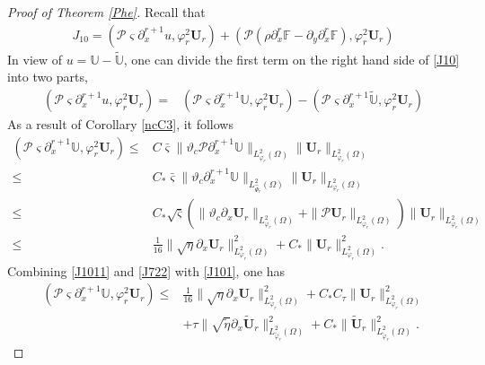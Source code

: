 \documentclass[10pt,a4paper]{amsart}
\begin{document}
\begin{proof}[Proof of Theorem \ref{Phe}]
Recall that
\begin{align}\label{J10}
J_{10}
= (\mathcal{P}\varsigma\partial_{x}^{r+1}u,\varphi_{r}^{2}\mathbf{U}_{r})
 +(\mathcal{P}(\rho\partial_{x}^{r}\mathbb{F}-\partial_{y}\partial_{x}^{r}\mathbb{F}),\varphi_{r}^{2}\mathbf{U}_{r})
\end{align}
In view of $u=\mathbb{U}-\tilde{\mathbb{U}}$, one can divide the first term on the right hand side of \eqref{J10} into two parts,
\begin{align}\label{J101}
(\mathcal{P}\varsigma\partial_{x}^{r+1}u,\varphi_{r}^{2}\mathbf{U}_{r})
=& (\mathcal{P}\varsigma\partial_{x}^{r+1}\mathbb{U},\varphi_{r}^{2}\mathbf{U}_{r})
  -(\mathcal{P}\varsigma\partial_{x}^{r+1}\tilde{\mathbb{U}},\varphi_{r}^{2}\mathbf{U}_{r})
\end{align}
As a result of Corollary \ref{ncC3}, it follows
\begin{align}\label{J1011}
(\mathcal{P}\varsigma\partial_{x}^{r+1}\mathbb{U},\varphi_{r}^{2}\mathbf{U}_{r})
\leq& C\bar{\varsigma}\|\vartheta_{c}\mathcal{P}\partial_{x}^{r+1}\mathbb{U}\|_{L_{\varphi_{r}}^{2}(\Omega)}
       \|\mathbf{U}_{r}\|_{L_{\varphi_{r}}^{2}(\Omega)}\\
\leq& C_{*}\bar{\varsigma}\|\vartheta_{c}\partial_{x}^{r+1}\mathbb{U}\|_{L_{\hat{\Psi}_{r}}^{2}(\Omega)}
       \|\mathbf{U}_{r}\|_{L_{\varphi_{r}}^{2}(\Omega)}\nonumber\\
\leq& C_{*}\sqrt{\bar{\varsigma}}
      \left(\|\vartheta_{c}\partial_{x}\mathbf{U}_{r}\|_{L_{\varphi_{r}}^{2}(\Omega)}
            +\|\mathcal{P}\mathbf{U}_{r}\|_{L_{\varphi_{r}}^{2}(\Omega)}\right)
      \|\mathbf{U}_{r}\|_{L_{\varphi_{r}}^{2}(\Omega)}\nonumber\\
\leq& \frac{1}{16}\|\sqrt{\eta}\partial_{x}\mathbf{U}_{r}\|_{L_{\varphi_{r}}^{2}(\Omega)}^{2}
     +C_{*}\|\mathbf{U}_{r}\|_{L_{\varphi_{r}}^{2}(\Omega)}^{2}.\nonumber
\end{align}
Combining \eqref{J1011} and \eqref{J722} with \eqref{J101}, one has
\begin{align}\label{J101'}
(\mathcal{P}\varsigma\partial_{x}^{r+1}\mathbb{U},\varphi_{r}^{2}\mathbf{U}_{r})
\leq& \frac{1}{16}\|\sqrt{\eta}\partial_{x}\mathbf{U}_{r}\|_{L_{\varphi_{r}}^{2}(\Omega)}^{2}
     +C_{*}C_{\tau}\|\mathbf{U}_{r}\|_{L_{\varphi_{r}}^{2}(\Omega)}^{2}\\
    &+\tau\|\sqrt{\tilde{\eta}}\partial_{x}\tilde{\mathbf{U}}_{r}\|_{L_{\tilde{\varphi}_{r}}^{2}(\Omega)}^{2}
     +C_{*}\|\tilde{\mathbf{U}}_{r}\|_{L_{\tilde{\varphi}_{r}}^{2}(\Omega)}^{2}.\nonumber
\end{align}


\end{proof}
\end{document}

